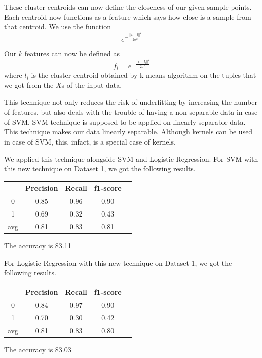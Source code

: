 These cluster centroids can now define the closeness of our given sample points.
Each centroid now functions as a feature which says how close is a sample from that centroid.
We use the function
$$e^{-\frac{||x-l||^2}{2\sigma^2}}$$


Our $k$ features can now be defined as
$$f_i=e^{-\frac{||x-l_i||^2}{2\sigma^2}}$$
where $l_i$ is the cluster centroid obtained by k-means algorithm on the tuples that we got from the $X$s of the input data.

This technique not only reduces the risk of underfitting by increasing the number of features, but also deals with the trouble of having a non-separable data in case of SVM.
SVM technique is supposed to be applied on linearly separable data. This technique makes our data linearly separable.
Although kernels can be used in case of SVM, this, infact, is a special case of kernels.

We applied this technique alongside SVM and Logistic Regression.
For SVM with this new technique on Dataset 1, we got the following results.

\begin{center}
\begin{tabular}{| c | c | c | c | c |}
\hline
    & Precision & Recall & f1-score \\
\hline
0 & 0.85 & 0.96 & 0.90 \\
\hline
1 & 0.69 & 0.32 & 0.43 \\
\hline
avg & 0.81 & 0.83 & 0.81 \\
\hline
\end{tabular}
\end{center} 
\begin{center}
The accuracy is 83.11%
\end{center}

For Logistic Regression with this new technique on Dataset 1, we got the following results.

\begin{center}
\begin{tabular}{| c | c | c | c | c |}
\hline
    & Precision & Recall & f1-score \\
\hline
0 & 0.84 & 0.97 & 0.90 \\
\hline
1 & 0.70 & 0.30 & 0.42 \\
\hline
avg & 0.81 & 0.83 & 0.80 \\
\hline
\end{tabular}
\end{center} 
\begin{center}
The accuracy is 83.03%
\end{center}

